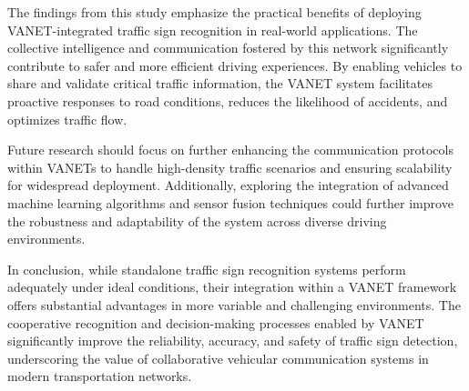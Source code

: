 The findings from this study emphasize the practical benefits of deploying VANET-integrated traffic sign recognition in real-world applications. The collective intelligence and communication fostered by this network significantly contribute to safer and more efficient driving experiences. By enabling vehicles to share and validate critical traffic information, the VANET system facilitates proactive responses to road conditions, reduces the likelihood of accidents, and optimizes traffic flow.

Future research should focus on further enhancing the communication protocols within VANETs to handle high-density traffic scenarios and ensuring scalability for widespread deployment. Additionally, exploring the integration of advanced machine learning algorithms and sensor fusion techniques could further improve the robustness and adaptability of the system across diverse driving environments.

In conclusion, while standalone traffic sign recognition systems perform adequately under ideal conditions, their integration within a VANET framework offers substantial advantages in more variable and challenging environments. The cooperative recognition and decision-making processes enabled by VANET significantly improve the reliability, accuracy, and safety of traffic sign detection, underscoring the value of collaborative vehicular communication systems in modern transportation networks.